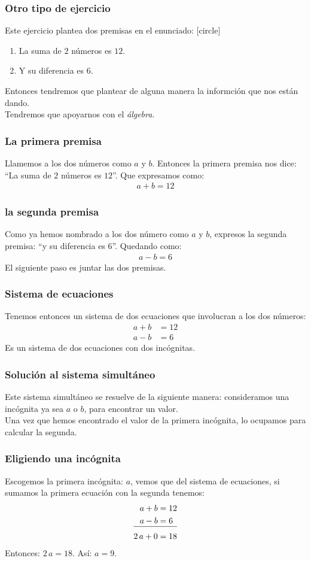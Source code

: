 \begin{frame}
\frametitle{Otro tipo de ejercicio}
Este ejercicio plantea dos premisas en el enunciado:
[circle]
\begin{enumerate}[<+->]
\item La suma de $2$ números es $12$.
\item Y su diferencia es $6$.
\end{enumerate}
\pause
Entonces tendremos que plantear de alguna manera la informción que nos están dando.
\\
\bigskip
\pause
Tendremos que apoyarnos con el \emph{álgebra}.
\end{frame}
\begin{frame}
\frametitle{La primera premisa}
Llamemos a los dos números como $a$ y $b$.
\pause
Entonces la primera premisa nos dice: \enquote{La suma de $2$ números es $12$}.
\pause
Que expresamos como:
\begin{align*}
a + b =  12
\end{align*}
\end{frame}
\begin{frame}
\frametitle{la segunda premisa}
Como ya hemos nombrado a los dos número como $a$ y $b$, expresos la segunda premisa: \enquote{y su diferencia es $6$}. Quedando como:
\begin{align*}
a - b =  6
\end{align*}
\pause
El siguiente paso es juntar las dos premisas.
\end{frame}
\begin{frame}
\frametitle{Sistema de ecuaciones}
Tenemos entonces un sistema de dos ecuaciones que involucran a los dos números:
\begin{align*}
a + b &= 12 \\[0.5em]
a - b &= 6
\end{align*}
Es un sistema de dos ecuaciones con dos incógnitas.
\end{frame}
\begin{frame}
\frametitle{Solución al sistema simultáneo}
Este sistema simultáneo se resuelve de la siguiente manera: consideramos una incógnita ya sea $a$ o $b$, para encontrar un valor.
\\
\bigskip
\pause
Una vez que hemos encontrado el valor de la primera incógnita, lo ocupamos para calcular la segunda.
\end{frame}
\begin{frame}
\frametitle{Eligiendo una incógnita}
Escogemos la primera incógnita: $a$, vemos que del sistema de ecuaciones, si sumamos la primera ecuación con la segunda tenemos:
\begin{align*}
a + b &= 12 \\
a - b &= 6 \\[-11pt]
\cline{1-2} 
2 \, a + 0 &= 18
\end{align*}
\pause
Entonces: $2 \, a =  18$. \hspace{1.5cm} \pause Así: $a = 9$.
\end{frame}
